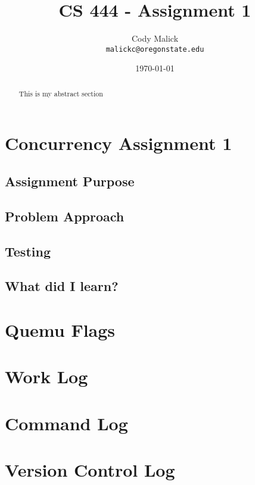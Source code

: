 \documentclass[10pt,letterpaper]{article}
\begin{document}
\begin{titlepage}
  \title{CS 444 - Assignment 1}
  \author{Cody Malick\\
  \texttt{malickc@oregonstate.edu}}
  \date{\today}
  \maketitle

  \begin{abstract}
      This is my abstract section
  \end{abstract}

\end{titlepage}

\tableofcontents
\clearpage

\section{Concurrency Assignment 1}
  \subsection{Assignment Purpose}
  \subsection{Problem Approach}
  \subsection{Testing}
  \subsection{What did I learn?}

\section{Quemu Flags}

\section{Work Log}

\section{Command Log}

\section{Version Control Log}
\end{document}
